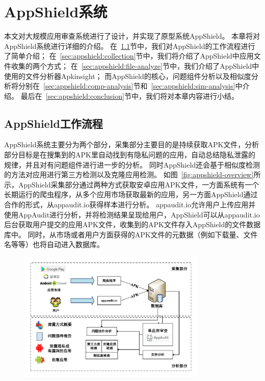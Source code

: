 \chapter{AppShield系统}
\label{chap:appshield}

本文对大规模应用审查系统进行了设计，并实现了原型系统AppShield。
本章将对AppShield系统进行详细的介绍。
在~\ref{sec:appshield:overview}节中，我们对AppShield的工作流程进行了简单介绍；
在~\ref{sec:appshield:collection}节中，我们将介绍了AppShield中应用文件收集的两个方式；
在~\ref{sec:appshield:file-analyze}节中，我们介绍了AppShield中使用的文件分析器Apkinsight；
而AppShield的核心，问题组件分析以及相似度分析将分别在~\ref{sec:appshield:comp-analysis}节和~\ref{sec:appshield:sim-analysis}中介绍。
最后在~\ref{sec:appshield:conclusion}节中，我们将对本章内容进行小结。

\section{AppShield工作流程}
\label{sec:appshield:overview}

AppShield系统主要分为两个部分，采集部分主要目的是持续获取APK文件，分析部分目标是在搜集到的APK里自动找到有隐私问题的应用，自动总结隐私泄露的规律，并且对有问题组件进行进一步的分析。
同时AppShield还会基于相似度检测的方法对应用进行第三方检测以及克隆应用检测。
如图~\ref{fig:appshield-overview}所示，AppShield采集部分通过两种方式获取安卓应用APK文件，一方面系统有一个长期运行的爬虫程序，从多个应用市场获取最新的应用，另一方面AppShield通过合作的形式，从appaudit.io获得样本进行分析。
appaudit.io允许用户上传应用并使用AppAudit进行分析，并将检测结果呈现给用户，AppShield可以从appaudit.io后台获取用户提交的应用APK文件，收集到的APK文件存入AppShield的文件数据库中。
同时，从市场或者用户方面获得的APK文件的元数据（例如下载量、文件名等等）也将自动进入数据库。

\begin{figure}
	\centering
	\includegraphics[width=0.8\textwidth]{figure/appshield-overview.pdf}
\end{figure}


